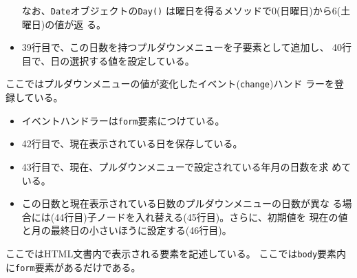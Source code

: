 \begin{Exec}
\begin{itemize}
			 なお、\texttt{Date}オブジェクトの\texttt{Day()}
       は曜日を得るメソッドで$0$(日曜日)から$6$(土曜日)の値が返
       る。
 \item 39行目で、この日数を持つプルダウンメニューを子要素として追加し、
			 40行目で、日の選択する値を設定している。
\end{itemize}
 ここではプルダウンメニューの値が変化したイベント(\texttt{change})ハンド
 ラーを登録している。
\begin{itemize}
 \item イベントハンドラーは\texttt{form}要素につけている。
 \item 42行目で、現在表示されている日を保存している。
 \item 43行目で、現在、プルダウンメニューで設定されている年月の日数を求
       めている。
 \item この日数と現在表示されている日数のプルダウンメニューの日数が異な
       る場合には(44行目)子ノードを入れ替える(45行目)。さらに、初期値を
       現在の値と月の最終日の小さいほうに設定する(46行目)。
\end{itemize}
ここではHTML文書内で表示される要素を記述している。
ここでは\texttt{body}要素内に\texttt{form}要素があるだけである。
\end{Exec}
